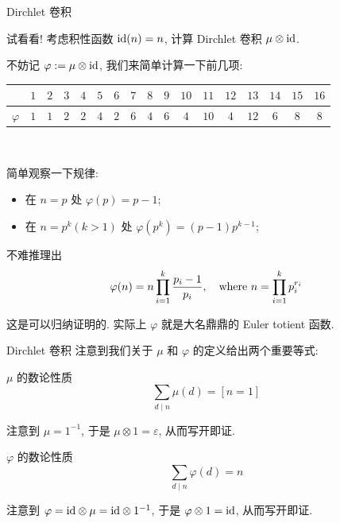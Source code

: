 \documentclass{beamer}
\begin{document}
    \begin{frame}{Dirchlet 卷积}
        \begin{block}{试看看!}
            考虑积性函数 ${\rm id}(n)=n$, 计算 Dirchlet 卷积 $\mu\otimes{\rm id}$.
        \end{block}
        \pause
        不妨记 $\varphi:=\mu\otimes{\rm id}$, 我们来简单计算一下前几项:
        \begin{center}
            \begin{tabular}{c|cccccccccccccccc}
                \toprule
                          & $1$ & $2$ & $3$ & $4$ & $5$ & $6$ & $7$ & $8$ & $9$ & $10$ & $11$ & $12$ & $13$ & $14$ & $15$ & $16$\\
                \hline
                $\varphi$ & $1$ & $1$ & $2$ & $2$ & $4$ & $2$ & $6$ & $4$ & $6$ & $4$  & $10$ &  $4$ & $12$ &  $6$ &  $8$ &  $8$\\
                \bottomrule
            \end{tabular}\\
        \end{center}
        简单观察一下规律:
        \begin{itemize}
            \item 在 $n=p$ 处 $\varphi(p)=p-1$;
            \item 在 $n=p^k(k>1)$ 处 $\varphi(p^k)=(p-1)p^{k-1}$;
        \end{itemize}
        不难推理出
        $$
        \varphi(n)=n\prod_{i=1}^k{p_i-1\over p_i},\quad\text{where }n=\prod_{i=1}^kp_i^{r_i}
        $$

        这是可以归纳证明的. 实际上 $\varphi$ 就是大名鼎鼎的 Euler totient 函数.
    \end{frame}

    \begin{frame}{Dirchlet 卷积}
        注意到我们关于 $\mu$ 和 $\varphi$ 的定义给出两个重要等式:
        \begin{block}{$\mu$ 的数论性质}
            $$
            \sum_{d\mid n}\mu(d)=[n=1]
            $$
        \end{block}
        注意到 $\mu=1^{-1}$, 于是 $\mu\otimes 1=\varepsilon$, 从而写开即证.
        \begin{block}{$\varphi$ 的数论性质}
            $$
            \sum_{d\mid n}\varphi(d)=n
            $$
        \end{block}
        注意到 $\varphi={\rm id}\otimes\mu={\rm id}\otimes 1^{-1}$, 于是 $\varphi\otimes 1={\rm id}$, 从而写开即证.
    \end{frame}
\end{document}
